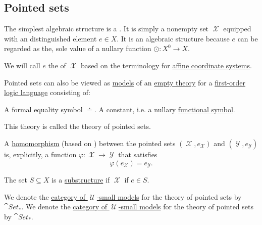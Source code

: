 \subsection{Pointed sets}\label{subsec:pointed_sets}

\begin{definition}\label{def:pointed_set}
  The simplest algebraic structure is a . It is simply a nonempty set \( \mscrX \) equipped with an distinguished element \( e \in X \). It is an algebraic structure because \( e \) can be regarded as the, sole value of a nullary function \( \odot: X^0 \to X \).

  We will call \( e \) the  of \( \mscrX \) based on the terminology for \hyperref[def:euclidean_plane_coordinate_system/origin]{affine coordinate systems}.

  \begin{thmenum}
     Pointed sets can also be viewed as \hyperref[def:first_order_semantics/satisfiability]{models} of an \hyperref[def:first_order_theory]{empty theory} for a \hyperref[def:first_order_language]{first-order logic language} consisting of:
    \begin{thmenum}
       A formal equality symbol \( \doteq \).
       A constant, i.e. a nullary \hyperref[def:first_order_language/func]{functional symbol}.
    \end{thmenum}

    This theory is called the theory of pointed sets.

     A \hyperref[def:first_order_homomorphism]{homomorphism} (based on ) between the pointed sets \( (\mscrX, e_{\mscrX}) \) and \( (\mscrY, e_{\mscrY}) \) is, explicitly, a function \( \varphi: \mscrX \to \mscrY \) that satisfies
    \begin{equation}\label{eq:def:pointed_set/homomorphism}
      \varphi(e_{\mscrX}) = e_{\mscrY}.
    \end{equation}

     The set \( S \subseteq X \) is a \hyperref[def:first_order_substructure]{substructure} if \( \mscrX \) if \( e \in S \).

     We denote the \hyperref[def:category_of_small_first_order_models]{category of \( \mscrU \)-small models} for the theory of pointed sets by \( \cat{Set}_* \). We denote the \hyperref[def:category_of_small_first_order_models]{category of \( \mscrU \)-small models} for the theory of pointed sets by \( \cat{Set}_* \).
  \end{thmenum}
\end{definition}
